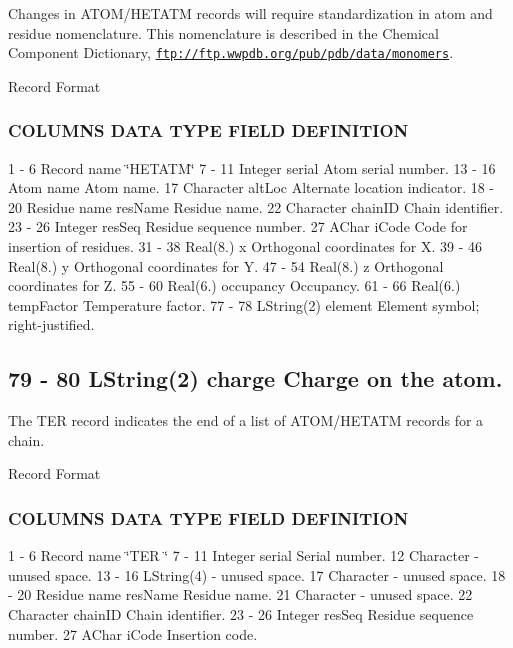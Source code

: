 Changes in A\-T\-O\-M/\-H\-E\-T\-A\-T\-M records will require standardization in atom and residue nomenclature. This nomenclature is described in the Chemical Component Dictionary, \href{ftp://ftp.wwpdb.org/pub/pdb/data/monomers}{\tt ftp\-://ftp.\-wwpdb.\-org/pub/pdb/data/monomers}.

Record Format

\subsubsection*{C\-O\-L\-U\-M\-N\-S D\-A\-T\-A T\-Y\-P\-E F\-I\-E\-L\-D D\-E\-F\-I\-N\-I\-T\-I\-O\-N}

1 -\/ 6 Record name \char`\"{}\-H\-E\-T\-A\-T\-M\char`\"{} 7 -\/ 11 Integer serial Atom serial number. 13 -\/ 16 Atom name Atom name. 17 Character alt\-Loc Alternate location indicator. 18 -\/ 20 Residue name res\-Name Residue name. 22 Character chain\-I\-D Chain identifier. 23 -\/ 26 Integer res\-Seq Residue sequence number. 27 A\-Char i\-Code Code for insertion of residues. 31 -\/ 38 Real(8.) x Orthogonal coordinates for X. 39 -\/ 46 Real(8.) y Orthogonal coordinates for Y. 47 -\/ 54 Real(8.) z Orthogonal coordinates for Z. 55 -\/ 60 Real(6.) occupancy Occupancy. 61 -\/ 66 Real(6.) temp\-Factor Temperature factor. 77 -\/ 78 L\-String(2) element Element symbol; right-\/justified. \subsection*{79 -\/ 80 L\-String(2) charge Charge on the atom.}

The T\-E\-R record indicates the end of a list of A\-T\-O\-M/\-H\-E\-T\-A\-T\-M records for a chain.

Record Format

\subsubsection*{C\-O\-L\-U\-M\-N\-S D\-A\-T\-A T\-Y\-P\-E F\-I\-E\-L\-D D\-E\-F\-I\-N\-I\-T\-I\-O\-N}

1 -\/ 6 Record name \char`\"{}\-T\-E\-R   \char`\"{} 7 -\/ 11 Integer serial Serial number. 12 Character -\/ unused space. 13 -\/ 16 L\-String(4) -\/ unused space. 17 Character -\/ unused space. 18 -\/ 20 Residue name res\-Name Residue name. 21 Character -\/ unused space. 22 Character chain\-I\-D Chain identifier. 23 -\/ 26 Integer res\-Seq Residue sequence number. 27 A\-Char i\-Code Insertion code.

